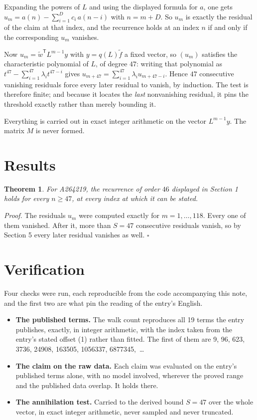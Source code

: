 \documentclass[11pt]{article}
\newtheorem{theorem}{Theorem}
\theoremstyle{definition}
\begin{document}
Expanding the powers of $L$ and using the displayed formula for $a$, one gets $u_m = a(n) - \sum_{i=1}^{D} c_i\,a(n-i)$ with $n = m + D$. So $u_m$ is exactly the residual of the claim at that index, and the recurrence holds at an index $n$ if and only if the corresponding $u_m$ vanishes.

Now $u_m = \tilde w^{\mathsf T} L^{m-1} y$ with $y = q(L)\tilde f$ a fixed vector, so $(u_m)$ satisfies the characteristic polynomial of $L$, of degree $47$: writing that polynomial as $t^{47} - \sum_{i=1}^{47} \lambda_i t^{47-i}$ gives $u_{m+47} = \sum_{i=1}^{47} \lambda_i u_{m+47-i}$. Hence $47$ consecutive vanishing residuals force every later residual to vanish, by induction. The test is therefore finite; and because it locates the {\itshape last} nonvanishing residual, it pins the threshold exactly rather than merely bounding it.

Everything is carried out in exact integer arithmetic on the vector $L^{m-1}y$. The matrix $M$ is never formed.

\section{Results}

\begin{theorem} For A264219, the recurrence of order $46$ displayed in Section 1 holds for every $n \ge 47$, at every index at which it can be stated.\end{theorem}

{\itshape Proof.} The residuals $u_m$ were computed exactly for $m = 1,\dots,118$. Every one of them vanished. After it, more than $S = 47$ consecutive residuals vanish, so by Section 5 every later residual vanishes as well. $\square$

\section{Verification}

Four checks were run, each reproducible from the code accompanying this note, and the first two are what pin the reading of the entry's English.

\begin{itemize}

\item {\bfseries The published terms.} The walk count reproduces all 19 terms the entry publishes, exactly, in integer arithmetic, with the index taken from the entry's stated offset (1) rather than fitted. The first of them are 9, 96, 623, 3736, 24908, 163505, 1056337, 6877345,~\dots

\item {\bfseries The claim on the raw data.} Each claim was evaluated on the entry's published terms alone, with no model involved, wherever the proved range and the published data overlap. It holds there.

\item {\bfseries The annihilation test.} Carried to the derived bound $S = 47$ over the whole vector, in exact integer arithmetic, never sampled and never truncated.

\end{itemize}
\end{document}
